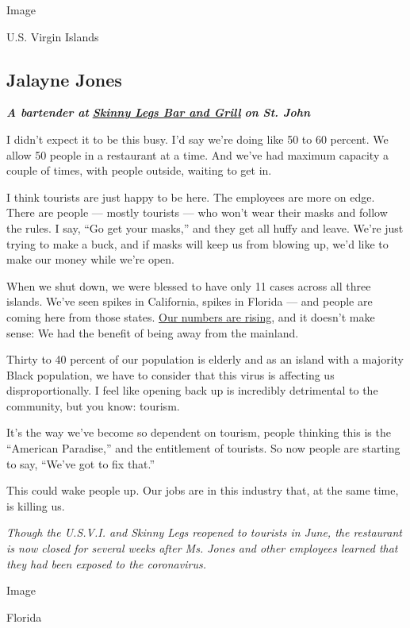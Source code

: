 Image

U.S. Virgin Islands

\hypertarget{jalayne-jones}{%
\subsection{Jalayne Jones}\label{jalayne-jones}}

\emph{\textbf{A bartender at}}
\textbf{\href{http://www.skinnylegsvi.com/}{\emph{Skinny Legs Bar and
Grill}}} \emph{\textbf{on St. John}}

I didn't expect it to be this busy. I'd say we're doing like 50 to 60
percent. We allow 50 people in a restaurant at a time. And we've had
maximum capacity a couple of times, with people outside, waiting to get
in.

I think tourists are just happy to be here. The employees are more on
edge. There are people --- mostly tourists --- who won't wear their
masks and follow the rules. I say, ``Go get your masks,'' and they get
all huffy and leave. We're just trying to make a buck, and if masks will
keep us from blowing up, we'd like to make our money while we're open.

When we shut down, we were blessed to have only 11 cases across all
three islands. We've seen spikes in California, spikes in Florida ---
and people are coming here from those states.
\href{https://www.covid19usvi.com/}{Our numbers are rising}, and it
doesn't make sense: We had the benefit of being away from the mainland.

Thirty to 40 percent of our population is elderly and as an island with
a majority Black population, we have to consider that this virus is
affecting us disproportionally. I feel like opening back up is
incredibly detrimental to the community, but you know: tourism.

It's the way we've become so dependent on tourism, people thinking this
is the ``American Paradise,'' and the entitlement of tourists. So now
people are starting to say, ``We've got to fix that.''

This could wake people up. Our jobs are in this industry that, at the
same time, is killing us.

\emph{Though the U.S.V.I. and Skinny Legs reopened to tourists in June,
the restaurant is now closed for several weeks after Ms. Jones and other
employees learned that they had been exposed to the coronavirus.}

Image

Florida


